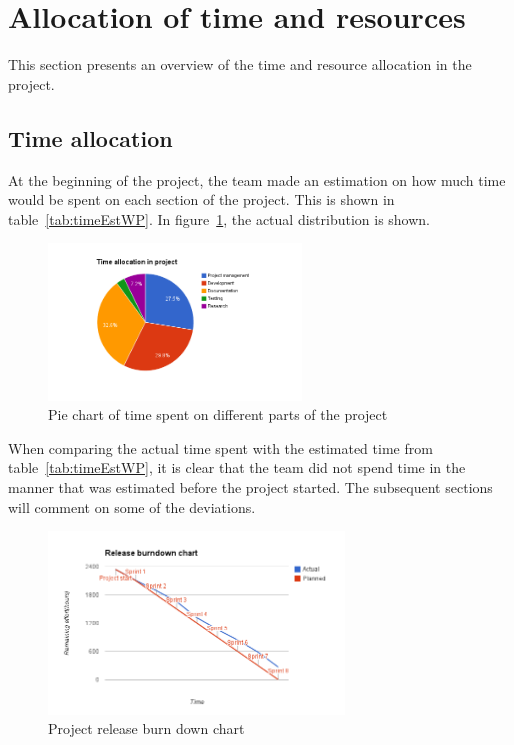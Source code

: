 \section{Allocation of time and resources}
\label{sec:timeSpent}
This section presents an overview of the time and resource allocation in the project.

\subsection{Time allocation}
At the beginning of the project, the team made an estimation on how much time would be spent on each section of the project. This is shown in table~\ref{tab:timeEstWP}. In figure~\ref{fig:piechart}, the  actual distribution is shown.

\begin{figure}[H]
\centering
\includegraphics[width=0.6\textwidth, clip, trim=4cm 2cm 4cm 1cm]{ch/retrospect/fig/timePie.png}
\caption{Pie chart of time spent on different parts of the project}
\label{fig:piechart}
\end{figure}

When comparing the actual time spent with the estimated time from table~\ref{tab:timeEstWP}, it is clear that the team did not spend time in the manner that was estimated before the project started. The subsequent sections will comment on some of the deviations.

\begin{figure}[H]
\centering
\includegraphics[width=0.7\textwidth, clip, trim=1.1cm 0.5cm 1.2cm 1cm]{ch/retrospect/fig/release.png}
\caption{Project release burn down chart}
\label{fig:release}
\end{figure}

